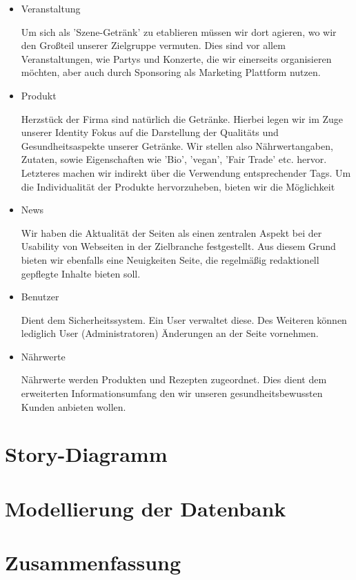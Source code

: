 \documentclass[12pt,a4paper,oneside,ngerman]{article}
\begin{document}
\begin{itemize}
\item Veranstaltung

Um sich als 'Szene-Getränk' zu etablieren müssen wir dort agieren, wo wir den Großteil unserer Zielgruppe vermuten.
Dies sind vor allem Veranstaltungen, wie Partys und Konzerte, die wir einerseits organisieren möchten, aber auch durch Sponsoring als Marketing Plattform nutzen.

\item Produkt

Herzstück der Firma sind natürlich die Getränke.
Hierbei legen wir im Zuge unserer Identity Fokus auf die Darstellung der Qualitäts und Gesundheitsaspekte unserer Getränke. Wir stellen also Nährwertangaben, Zutaten, sowie Eigenschaften wie 'Bio', 'vegan', 'Fair Trade' etc. hervor.
Letzteres machen wir indirekt über die Verwendung entsprechender Tags.
Um die Individualität der Produkte hervorzuheben, bieten wir die Möglichkeit 

\item News

Wir haben die Aktualität der Seiten als einen zentralen Aspekt bei der Usability von Webseiten in der Zielbranche festgestellt.
Aus diesem Grund bieten wir ebenfalls eine Neuigkeiten Seite, die regelmäßig redaktionell gepflegte Inhalte bieten soll.

\item Benutzer

Dient dem Sicherheitssystem. Ein User verwaltet diese. Des Weiteren können lediglich User (Administratoren) Änderungen an der Seite vornehmen.

\item Nährwerte

Nährwerte werden Produkten und Rezepten zugeordnet. Dies dient dem erweiterten Informationsumfang den wir unseren gesundheitsbewussten Kunden anbieten wollen.

\end{itemize}


\section{Story-Diagramm} %



\section{Modellierung der Datenbank} %

\section{Zusammenfassung} %
\end{document}
